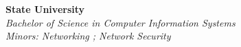 
\textbf{State University} \\
\textit{Bachelor of Science in Computer Information Systems} \\
\textit{Minors: Networking ; Network Security}